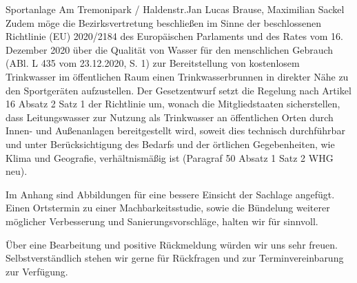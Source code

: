 \documentclass{../../templates/amendment}
\begin{document}
\begin{boxed}{Sportanlage Am Tremonipark / Haldenstr.}{Jan Lucas Brause, Maximilian Sackel}
    Zudem möge die Bezirksvertretung beschließen im Sinne der beschlossenen Richtlinie (EU) 2020/2184 des Europäischen Parlaments und des Rates vom 16. Dezember 2020 über die Qualität von Wasser für den menschlichen Gebrauch (ABl. L 435 vom 23.12.2020, S. 1) zur Bereitstellung von kostenlosem Trinkwasser im öffentlichen Raum einen Trinkwasserbrunnen in direkter Nähe zu den Sportgeräten aufzustellen.
    Der Gesetzentwurf setzt die Regelung nach Artikel 16 Absatz 2 Satz 1 der Richtlinie um, wonach die Mitgliedstaaten sicherstellen, dass Leitungswasser zur Nutzung als Trinkwasser an öffentlichen Orten durch Innen- und Außenanlagen bereitgestellt wird, soweit dies technisch durchführbar und unter Berücksichtigung des Bedarfs und der örtlichen Gegebenheiten, wie Klima und Geografie, verhältnismäßig ist (Paragraf 50 Absatz 1 Satz 2 WHG neu).

    Im Anhang sind Abbildungen für eine bessere Einsicht der Sachlage angefügt.
    Einen Ortstermin zu einer Machbarkeitsstudie, sowie die Bündelung weiterer möglicher Verbesserung und Sanierungsvorschläge, halten wir für sinnvoll.

    Über eine Bearbeitung und positive Rückmeldung würden wir uns sehr freuen.
    Selbstverständlich stehen wir gerne für Rückfragen und zur Terminvereinbarung zur Verfügung.


\end{boxed}
\end{document}
